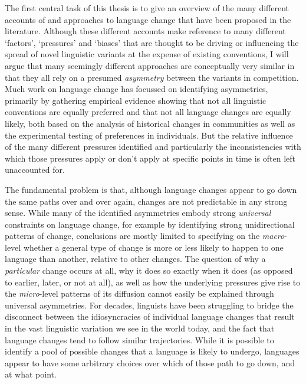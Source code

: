 The first central task of this thesis is to give an overview of the many different accounts of and approaches to language change that have been proposed in the literature. Although these different accounts make reference to many different `factors', `pressures' and `biases' that are thought to be driving or influencing the spread of novel linguistic variants at the expense of existing conventions, I will argue that many seemingly different approaches are conceptually very similar in that they all rely on a presumed \emph{asymmetry} between the variants in competition.
Much work on language change has focussed on identifying asymmetries, primarily by gathering empirical evidence showing that not all linguistic conventions are equally preferred and that not all language changes are equally likely, both based on the analysis of historical changes in communities as well as the experimental testing of preferences in individuals. 
But the relative influence of the many different pressures identified and particularly the inconsistencies with which those pressures apply or don't apply at specific points in time is often left unaccounted for.

The fundamental problem is that, although language changes appear to go down the same paths over and over again, changes are not predictable in any strong sense.
While many of the identified asymmetries embody strong \emph{universal} constraints on language change, for example by identifying strong unidirectional patterns of change, conclusions are mostly limited to specifying on the \emph{macro}-level whether a general type of change is more or less likely to happen to one language than another, relative to other changes.
The question of why a \emph{particular} change occurs at all, why it does so exactly when it does (as opposed to earlier, later, or not at all), as well as how the underlying pressures give rise to the \emph{micro}-level patterns of its diffusion cannot easily be explained through universal asymmetries.
For decades, linguists have been struggling to bridge the disconnect between the idiosyncracies of individual language changes that result in the vast linguistic variation we see in the world today, and the fact that language changes tend to follow similar trajectories.
While it is possible to identify a pool of possible changes that a language is likely to undergo, languages appear to have some arbitrary choices over which of those path to go down, and at what point.


